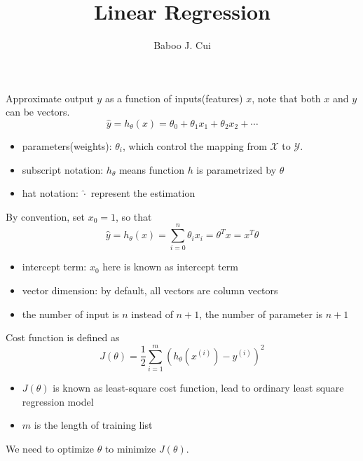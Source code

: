 \documentclass[10pt,a4paper,oneside]{article}
\author{Baboo J. Cui}
\begin{document}
\title{Linear Regression}
\maketitle

Approximate output $y$ as a function of inputs(features) $x$, note that both $x$ and $y$ can be vectors.
\[
\hat{y} = h_\theta(x) = \theta_0 + \theta_1 x_1 + \theta_2 x_2 + \cdots
\]
\begin{itemize}
	\item parameters(weights): $\theta_i$, which control the mapping from $\mathcal{X}$ to $\mathcal{Y}$.
	\item subscript notation: $h_\theta$ means function $h$ is parametrized by $\theta$
	\item hat notation: $\hat{\cdot}$ represent the estimation
\end{itemize}
By convention, set $x_0 = 1$, so that
\[
\hat{y} = h_\theta (x) = \sum_{i=0}^{n} \theta_i x_i = \theta^T x = x^T \theta
\] 
\begin{itemize}
	\item intercept term: $x_0$ here is known as intercept term
	\item vector dimension: by default, all vectors are column vectors
	\item the number of input is $n$ instead of $n+1$, the number of parameter is $n+1$
\end{itemize}
Cost function is defined as
\[
J(\theta) = \frac{1}{2} \sum_{i=1}^{m} (h_\theta(x^{(i)}) - y^{(i)})^2
\]
\begin{itemize}
	\item $J(\theta)$ is known as least-square cost function, lead to ordinary least square regression model
	\item  $m$ is the length of training list
\end{itemize}
We need to optimize $\theta$ to minimize $J(\theta)$.
\end{document}
